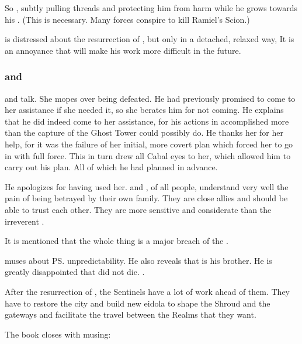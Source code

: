 So \Azraid{} , subtly pulling threads and protecting him from harm while he grows towards his \apotheosis. 
(This is necessary. Many forces conspire to kill Ramiel's Scion.)

\Azraid{} is distressed about the resurrection of \Nithdornazsh, but only in a detached, relaxed way, 
It is an annoyance that will make his work more difficult in the future. 






\subsubsection{\Secherdamon{} and \Nzessuacrith}
\Secherdamon{} and \Nzessuacrith{} talk. 
She mopes over being defeated. 
He had previously promised to come to her assistance if she needed it, so she berates him for not coming. 
He explains that he did indeed come to her assistance, for his actions in \Malcur accomplished more than the capture of the Ghost Tower could possibly do. 
He thanks her for her help, for it was the failure of her initial, more covert plan which forced her to go in with full force. 
This in turn drew all Cabal eyes to her, which allowed him to carry out his plan. 
All of which he had planned in advance. 

He apologizes for having used her. 
\Secherdamon{} and \Nzessuacrith, of all people, understand very well the pain of being betrayed by their own family. 
They are close allies and should be able to trust each other. 
They are more sensitive and considerate than the irreverent \Ishnaruchaefir. 

It is mentioned that the whole thing is a major breach of the \charade. 

\Secherdamon{} muses about \ps{\Ishnaruchaefir} unpredictability. 
He also reveals that \Ishnaruchaefir{} is his brother. 
He is greatly disappointed that \Ishnaruchaefir{} did not die. 
\Secherdamon{} . 

After the resurrection of \Nithdornazsh, the Sentinels have a lot of work ahead of them.
They have to restore the city and build new eidola to shape the Shroud and the gateways and facilitate the travel between the Realms that they want. 

The book closes with \Secherdamon{} musing:















